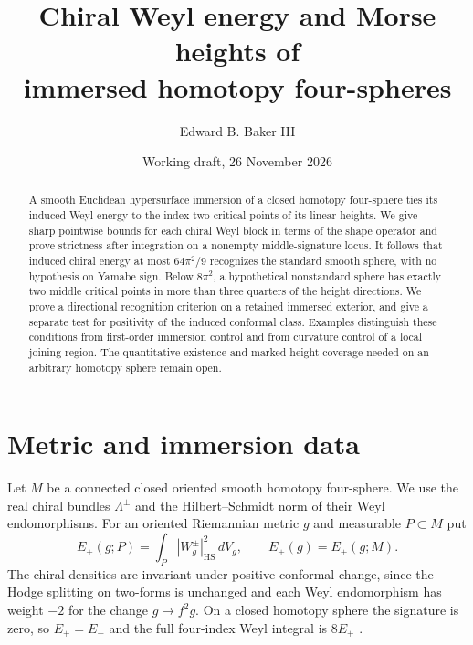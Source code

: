 \documentclass[11pt,letterpaper]{article}
\title{Chiral Weyl energy and Morse heights of\\immersed homotopy four-spheres}
\author{Edward B. Baker III}
\date{Working draft, 26 November 2026}
\numberwithin{equation}{section}
\begin{document}
\maketitle
\begin{abstract}
A smooth Euclidean hypersurface immersion of a closed homotopy
four-sphere ties its induced Weyl energy to the index-two critical
points of its linear heights. We give sharp pointwise bounds for
each chiral Weyl block in terms of the shape operator and prove
strictness after integration on a nonempty middle-signature locus.
It follows that induced chiral energy at most \(64\pi^2/9\) recognizes
the standard smooth sphere, with no hypothesis on Yamabe sign.
Below \(8\pi^2\), a hypothetical nonstandard sphere has exactly two
middle critical points in more than three quarters of the height
directions. We prove a directional recognition criterion on a
retained immersed exterior, and give a separate test for positivity
of the induced conformal class. Examples distinguish these conditions
from first-order immersion control and from curvature control of
a local joining region. The quantitative existence and marked
height coverage needed on an arbitrary homotopy sphere remain open.
\end{abstract}

\section{Metric and immersion data}

Let \(M\) be a connected closed oriented smooth homotopy four-sphere.
We use the real chiral bundles \(\Lambda^\pm\) and the
Hilbert--Schmidt norm of their Weyl endomorphisms. For an oriented
Riemannian metric \(g\) and measurable \(P\subset M\) put
\[
 E_\pm(g;P)=\int_P |W_g^\pm|_{\mathrm{HS}}^2\,dV_g,
 \qquad E_\pm(g)=E_\pm(g;M).
\]
The chiral densities are invariant under positive conformal change,
since the Hodge splitting on two-forms is unchanged and each Weyl
endomorphism has weight \(-2\) for the change \(g\mapsto f^2g\).
On a closed homotopy sphere the signature is zero,
so \(E_+=E_-\) and the full four-index Weyl integral is \(8E_+\)
\cite[Remark 2 and (0.4)]{ChangGurskyYang2003}.
\end{document}
